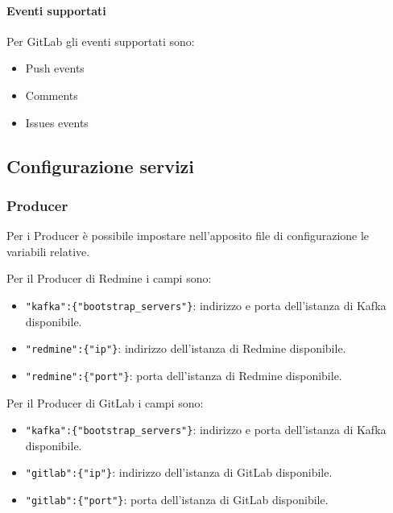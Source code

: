 	\paragraph{Eventi supportati}
	Per GitLab gli eventi supportati sono:
	\begin{itemize}
		\item Push events
		\item Comments
		\item Issues events
	\end{itemize}

\subsection{Configurazione servizi \progetto}\label{var}

	\subsubsection{Producer}
	Per i Producer è possibile impostare nell'apposito file di configurazione le variabili relative.

	Per il Producer di Redmine i campi sono:
	\begin{itemize}
		\item\texttt{"kafka":\{"bootstrap\_servers"\}}: indirizzo e porta dell'istanza di Kafka disponibile.
		\item\texttt{"redmine":\{"ip"\}}: indirizzo dell'istanza di Redmine disponibile.
		\item\texttt{"redmine":\{"port"\}}: porta dell'istanza di Redmine disponibile.
	\end{itemize}

	Per il Producer di GitLab i campi sono:
	\begin{itemize}
		\item\texttt{"kafka":\{"bootstrap\_servers"\}}: indirizzo e porta dell'istanza di Kafka disponibile.
		\item\texttt{"gitlab":\{"ip"\}}: indirizzo dell'istanza di GitLab disponibile.
		\item\texttt{"gitlab":\{"port"\}}: porta dell'istanza di GitLab disponibile.
	\end{itemize}

